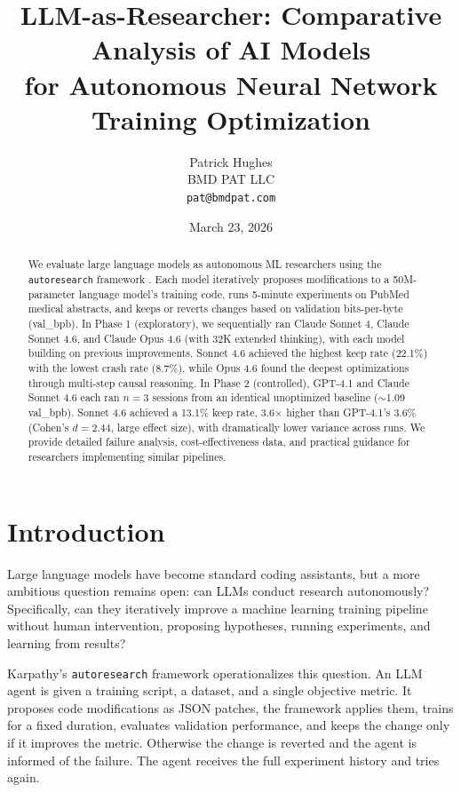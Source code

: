 \documentclass[11pt]{article}
\title{LLM-as-Researcher: Comparative Analysis of AI Models\\for Autonomous Neural Network Training Optimization}
\author{
    Patrick Hughes\\
    BMD PAT LLC\\
    \texttt{pat@bmdpat.com}
}
\date{March 23, 2026}
\begin{document}
\maketitle

\begin{abstract}
We evaluate large language models as autonomous ML researchers using the \texttt{autoresearch} framework \citep{karpathy2026autoresearch}. Each model iteratively proposes modifications to a 50M-parameter language model's training code, runs 5-minute experiments on PubMed medical abstracts, and keeps or reverts changes based on validation bits-per-byte (val\_bpb). In Phase 1 (exploratory), we sequentially ran Claude Sonnet 4, Claude Sonnet 4.6, and Claude Opus 4.6 (with 32K extended thinking), with each model building on previous improvements. Sonnet 4.6 achieved the highest keep rate (22.1\%) with the lowest crash rate (8.7\%), while Opus 4.6 found the deepest optimizations through multi-step causal reasoning. In Phase 2 (controlled), GPT-4.1 and Claude Sonnet 4.6 each ran $n=3$ sessions from an identical unoptimized baseline ($\sim$1.09 val\_bpb). Sonnet 4.6 achieved a 13.1\% keep rate, 3.6$\times$ higher than GPT-4.1's 3.6\% (Cohen's $d = 2.44$, large effect size), with dramatically lower variance across runs. We provide detailed failure analysis, cost-effectiveness data, and practical guidance for researchers implementing similar pipelines.
\end{abstract}

\section{Introduction}
\label{sec:introduction}

Large language models have become standard coding assistants, but a more ambitious question remains open: can LLMs conduct research autonomously? Specifically, can they iteratively improve a machine learning training pipeline without human intervention, proposing hypotheses, running experiments, and learning from results?

Karpathy's \texttt{autoresearch} framework \citep{karpathy2026autoresearch} operationalizes this question. An LLM agent is given a training script, a dataset, and a single objective metric. It proposes code modifications as JSON patches, the framework applies them, trains for a fixed duration, evaluates validation performance, and keeps the change only if it improves the metric. Otherwise the change is reverted and the agent is informed of the failure. The agent receives the full experiment history and tries again.
\end{document}

